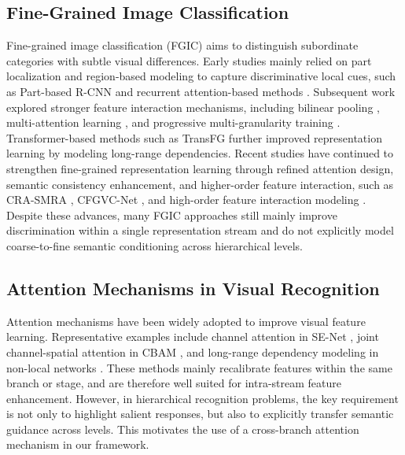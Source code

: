 \documentclass[pdflatex,iicol,sn-mathphys-num]{sn-jnl}
\theoremstyle{thmstyleone}%
\theoremstyle{thmstyletwo}%
\theoremstyle{thmstylethree}%
\begin{document}
\subsection{Fine-Grained Image Classification}
Fine-grained image classification (FGIC) aims to distinguish subordinate categories with subtle visual differences. 
Early studies mainly relied on part localization and region-based modeling to capture discriminative local cues, such as Part-based R-CNN \cite{part_rcnn} and recurrent attention-based methods \cite{fu2017look}. 
Subsequent work explored stronger feature interaction mechanisms, including bilinear pooling \cite{bilinear_cnn}, multi-attention learning \cite{zheng2017learning}, and progressive multi-granularity training \cite{du2020fine}. 
Transformer-based methods such as TransFG \cite{he2021transfg} further improved representation learning by modeling long-range dependencies. 
Recent studies have continued to strengthen fine-grained representation learning through refined attention design, semantic consistency enhancement, and higher-order feature interaction, such as CRA-SMRA \cite{wang2025crasmra}, CFGVC-Net \cite{wang2025cfgvc}, and high-order feature interaction modeling \cite{sikdar2025interweaving}. 
Despite these advances, many FGIC approaches still mainly improve discrimination within a single representation stream and do not explicitly model coarse-to-fine semantic conditioning across hierarchical levels.

\subsection{Attention Mechanisms in Visual Recognition}
Attention mechanisms have been widely adopted to improve visual feature learning. 
Representative examples include channel attention in SE-Net \cite{hu2018squeeze}, joint channel-spatial attention in CBAM \cite{woo2018cbam}, and long-range dependency modeling in non-local networks \cite{nonlocal}. 
These methods mainly recalibrate features within the same branch or stage, and are therefore well suited for intra-stream feature enhancement. 
However, in hierarchical recognition problems, the key requirement is not only to highlight salient responses, but also to explicitly transfer semantic guidance across levels. 
This motivates the use of a cross-branch attention mechanism in our framework.
\end{document}

